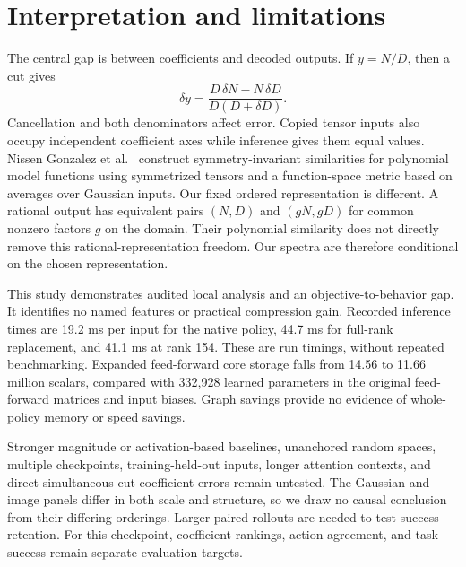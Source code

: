 \documentclass{article}
\begin{document}
\section{Interpretation and limitations}

The central gap is between coefficients and decoded outputs. If $y=N/D$, then a cut gives
\begin{equation}
 \delta y=\frac{D\,\delta N-N\,\delta D}{D(D+\delta D)}.
 \label{eq.quotient}
\end{equation}
Cancellation and both denominators affect error. Copied tensor inputs also occupy independent coefficient axes while inference gives them equal values. Nissen Gonzalez et al.~\citep{gonzalez2026} construct symmetry-invariant similarities for polynomial model functions using symmetrized tensors and a function-space metric based on averages over Gaussian inputs. Our fixed ordered representation is different. A rational output has equivalent pairs $(N,D)$ and $(gN,gD)$ for common nonzero factors $g$ on the domain. Their polynomial similarity does not directly remove this rational-representation freedom. Our spectra are therefore conditional on the chosen representation.

This study demonstrates audited local analysis and an objective-to-behavior gap. It identifies no named features or practical compression gain. Recorded inference times are 19.2 ms per input for the native policy, 44.7 ms for full-rank replacement, and 41.1 ms at rank 154. These are run timings, without repeated benchmarking. Expanded feed-forward core storage falls from 14.56 to 11.66 million scalars, compared with 332,928 learned parameters in the original feed-forward matrices and input biases. Graph savings provide no evidence of whole-policy memory or speed savings.

Stronger magnitude or activation-based baselines, unanchored random spaces, multiple checkpoints, training-held-out inputs, longer attention contexts, and direct simultaneous-cut coefficient errors remain untested. The Gaussian and image panels differ in both scale and structure, so we draw no causal conclusion from their differing orderings. Larger paired rollouts are needed to test success retention. For this checkpoint, coefficient rankings, action agreement, and task success remain separate evaluation targets.
\end{document}
